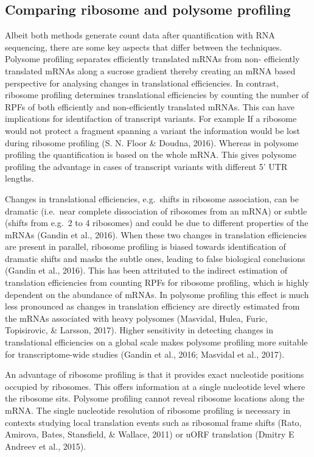 \documentclass[12pt,openany]{book}
\begin{document}
\subsection{Comparing ribosome and polysome profiling}

Albeit both methods generate count data after quantification with RNA
sequencing, there are some key aspects that differ between the
techniques. Polysome profiling separates efficiently translated mRNAs
from non- efficiently translated mRNAs along a sucrose gradient thereby
creating an mRNA based perspective for analysing changes in
translational efficiencies. In contrast, ribosome profiling determines
translational efficiencies by counting the number of RPFs of both
efficiently and non-efficiently translated mRNAs. This can have
implications for identifaction of transcript variants. For example If a
ribosome would not protect a fragment spanning a variant the information
would be lost during ribosome profiling (S. N. Floor \& Doudna, 2016).
Whereas in polysome profiling the quantification is based on the whole
mRNA. This gives polysome profiling the advantage in cases of transcript
variants with different 5' UTR lengths.

Changes in translational efficiencies, e.g.~shifts in ribosome
association, can be dramatic (i.e.~near complete dissociation of
ribosomes from an mRNA) or subtle (shifts from e.g.~2 to 4 ribosomes)
and could be due to different properties of the mRNAs (Gandin et al.,
2016). When these two changes in translation efficiencies are present in
parallel, ribosome profiling is biased towards identification of
dramatic shifts and masks the subtle ones, leading to false biological
conclusions (Gandin et al., 2016). This has been attrituted to the
indirect estimation of translation efficiencies from counting RPFs for
ribosome profiling, which is highly dependent on the abundance of mRNAs.
In polysome profiling this effect is much less pronounced as changes in
translation efficiency are directly estimated from the mRNAs associated
with heavy polysomes (Masvidal, Hulea, Furic, Topisirovic, \& Larsson,
2017). Higher sensitivity in detecting changes in translational
efficiencies on a global scale makes polysome profiling more suitable
for transcriptome-wide studies (Gandin et al., 2016; Masvidal et al.,
2017).

An advantage of ribosome profiling is that it provides exact nucleotide
positions occupied by ribosomes. This offers information at a single
nucleotide level where the ribosome sits. Polysome profiling cannot
reveal ribosome locations along the mRNA. The single nucleotide
resolution of ribosome profiling is necessary in contexts studying local
translation events such as ribosomal frame shifts (Rato, Amirova, Bates,
Stansfield, \& Wallace, 2011) or uORF translation (Dmitry E Andreev et
al., 2015).
\end{document}
